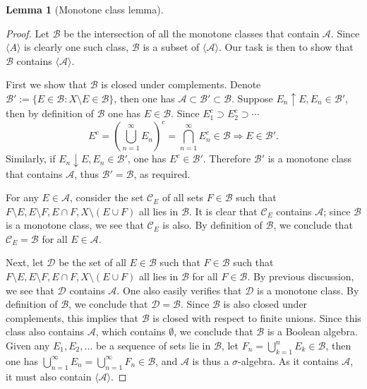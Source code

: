 \documentclass[a4paper]{article}
\newtheorem{lem}{Lemma}[subsection]
\begin{document}
\setcounter{lem}{13}\begin{lem}[Monotone class lemma]\end{lem}\begin{proof}
Let $\mathcal{B}$ be the intersection of all the monotone classes that contain $\mathcal{A}$. Since $\langle A \rangle$ 
is clearly one such class, $\mathcal{B}$ is a subset of $\langle \mathcal{A} \rangle$. Our task is then to show that $\mathcal{B}$ contains
$\langle \mathcal{A} \rangle$.

First we show that $\mathcal{B}$ is closed under complements. Denote $\mathcal{B}' := \{E \in \mathcal{B} : X \setminus E \in \mathcal{B}\}$,
then one has $\mathcal{A} \subset \mathcal{B}' \subset \mathcal{B}$. Suppose $E_n \uparrow E, E_n \in \mathcal{B}'$,
then by definition of $\mathcal{B}$ one has $E \in \mathcal{B}$. Since $E_1^c \supset E_2^c \supset \cdots $$$
E^c = (\bigcup_{n = 1}^\infty E_n)^c = \bigcap_{n = 1}^\infty E_n^c \in \mathcal{B} \Rightarrow E \in \mathcal{B}'.
$$Similarly, if $E_n \downarrow E, E_n \in \mathcal{B}'$, one has $E^c \in \mathcal{B}'$. Therefore $\mathcal{B}'$
is a monotone class that contains $\mathcal{A}$, thus $\mathcal{B}' = \mathcal{B}$, as required.

For any $E \in \mathcal{A}$, consider the set $\mathcal{C}_E$ of all sets $F \in \mathcal{B}$ such that $F \setminus E,
E \setminus F, E \cap F, X \setminus (E \cup F)$ all lies in $\mathcal{B}$. It is clear that $\mathcal{C}_E$ contains $\mathcal{A}$; 
since $\mathcal{B}$ is a monotone class, we see that $\mathcal{C}_E$ is also. By definition of $\mathcal{B}$, we 
conclude that $\mathcal{C}_E = \mathcal{B}$ for all $E \in \mathcal{A}$.

Next, let $\mathcal{D}$ be the set of all $E \in \mathcal{B}$ such that $F \in \mathcal{B}$ such that $F \setminus E,
E \setminus F, E \cap F, X \setminus (E \cup F)$ all lies in $\mathcal{B}$ for all $F \in \mathcal{B}$. By previous 
discussion, we see that $\mathcal{D}$ contains $\mathcal{A}$. One also easily verifies that $\mathcal{D}$ is a monotone class. 
By definition of $\mathcal{B}$, we conclude that $\mathcal{D} = \mathcal{B}$. Since $\mathcal{B}$ is also closed under complements, 
this implies that $\mathcal{B}$ is closed with respect to finite unions. Since this class also contains $\mathcal{A}$, 
which contains $\emptyset$, we conclude that $\mathcal{B}$ is a Boolean algebra. Given any $E_1, E_2, \dots$ be a
sequence of sets lie in $\mathcal{B}$, let $F_n = \bigcup_{k = 1}^n E_k \in \mathcal{B}$, then one has 
$\bigcup_{n = 1}^\infty E_n = \bigcup_{n = 1}^\infty F_n \in \mathcal{B}$, and $\mathcal{A}$ is thus a $\sigma$-algebra.
As it contains $\mathcal{A}$, it must also contain $\langle \mathcal{A} \rangle$.
\end{proof}
\end{document}
